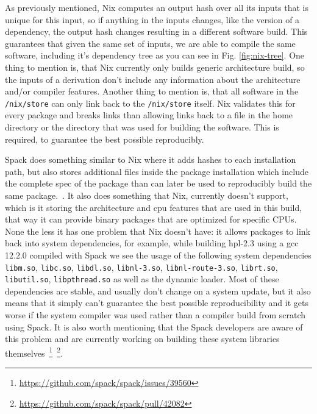 \documentclass{eceasst}
\begin{document}
As previously mentioned, Nix computes an output hash over all its inputs that is unique for this input, so if anything in the inputs changes, like the version of a dependency, the output hash changes resulting in a different software build.
This guarantees that given the same set of inputs, we are able to compile the same software, including it's dependency tree as you can see in Fig. \ref{fig:nix-tree}.
One thing to mention is, that Nix currently only builds generic architecture build, so the inputs of a derivation don't include any information about the architecture and/or compiler features.
Another thing to mention is, that all software in the \texttt{/nix/store} can only link back to the \texttt{/nix/store} itself.
Nix validates this for every package and breaks links than allowing links back to a file in the home directory or the directory that was used for building the software.
This is required, to guarantee the best possible reproducibly.

Spack does something similar to Nix where it adds hashes to each installation path, but also stores additional files inside the package installation which include the complete spec of the package than can later be used to reproducibly build the same package.~\cite{Gamblin_2015}.
It also does something that Nix, currently doesn't support, which is it storing the architecture and cpu features that are used in this build, that way it can provide binary packages that are optimized for specific CPUs.
None the less it has one problem that Nix doesn't have: it allows packages to link back into system dependencies, for example, while building hpl-2.3 using a gcc 12.2.0 compiled with Spack we see the usage of the following system dependencies \texttt{libm.so}, \texttt{libc.so}, \texttt{libdl.so}, \texttt{libnl-3.so}, \texttt{libnl-route-3.so}, \texttt{librt.so}, \texttt{libutil.so}, \texttt{libpthread.so} as well as the dynamic loader.
Most of these dependencies are stable, and usually don't change on a system update, but it also means that it simply can't guarantee the best possible reproducibility and it gets worse if the system compiler was used rather than a compiler build from scratch using Spack.
It is also worth mentioning that the Spack developers are aware of this problem and are currently working on building these system libraries themselves~\footnote{\url{https://github.com/spack/spack/issues/39560}}~\footnote{\url{https://github.com/spack/spack/pull/42082}}.
\end{document}
